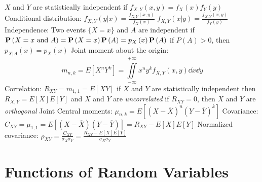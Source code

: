 \documentclass[a4paper,11pt]{article}
\begin{document}
\begin{outline}[enumerate]
			\2 $X$ and $Y$ are statistically independent if $f_{X, Y}\left(x, y\right) = f_{X}\left(x\right)f_{Y}\left(y\right)$
		\1 Conditional distribution:
			\2 $f_{X, Y}\left(y | x\right) = \frac{f_{X, Y}\left(x, y\right)}{f_{X}\left(x\right)}$
			\2 $f_{X, Y}\left(x | y\right) = \frac{f_{X, Y}\left(x, y\right)}{f_{Y}\left(y\right)}$	
		\1 Independence: Two events $\{X = x\}$ and $A$ are independent if $\mathbf{P}\left(X = x \text{ and } A\right) = \mathbf{P}\left(X = x\right)\mathbf{P}\left(A\right) = p_{X}\left(x\right)\mathbf{P}\left(A\right)$	
			\2 if $P\left(A\right) > 0$, then $p_{X | A}\left(x\right) = p_{X}\left(x\right)$
		\1 Joint moment about the origin:
			\begin{equation}
				m_{n, k} = E\left[X^{n} Y^{k}\right] = \iint
				\limits_{-\infty}^{+\infty} x^{n} y^{k} f_{X, Y} \left(x, y\right) \dd x \dd y
			\end{equation}	
		\1 Correlation: $R_{XY} = m_{1, 1} = E\left[XY\right]$	
			\2 if $X$ and $Y$ are statistically independent then $R_{X, Y} = E\left[X\right]E\left[Y\right]$ and $X$ and $Y$ are \textit{uncorrelated}
			\2 if $R_{XY} = 0$, then $X$ and $Y$ are \textit{orthogonal}
		\1 Joint Central moments: $\mu_{n, k} = E\left[\left(X - \overline{X}\right)^{n} \left(Y - \overline{Y}\right)^{k} \right]$	
			\2 Covariance: $C_{XY} = \mu_{1, 1} = E\left[\left(X - \overline{X}\right) \left(Y - \overline{Y}\right) \right] = R_{XY} - E\left[X\right]E\left[Y\right]$
			\2 Normalized covariance: $\rho_{XY} = \frac{C_{XY}}{\sigma_{X}\sigma_{Y}} = \frac{R_{XY} - E\left[X\right]E\left[Y\right]}{\sigma_{X}\sigma_{Y}}$
		
	\end{outline}

	\section{Functions of Random Variables}
\end{document}
